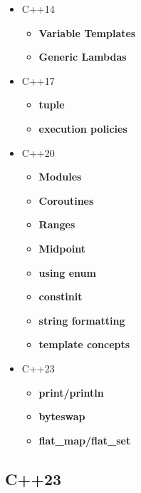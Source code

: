 \documentclass{article}
\begin{document}
\begin{itemize}
\begin{itemize}
	      \end{itemize}
	\item C++14
	      \begin{itemize}
		      \item \textbf{Variable Templates}
		      \item \textbf{Generic Lambdas}
	      \end{itemize}
	\item C++17
	      \begin{itemize}
		      \item \textbf{tuple}
		      \item \textbf{execution policies}
	      \end{itemize}
	\item C++20
	      \begin{itemize}
		      \item \textbf{Modules}
		      \item \textbf{Coroutines}
		      \item \textbf{Ranges}
		      \item \textbf{Midpoint}
		      \item \textbf{using enum}
		      \item \textbf{constinit}
		      \item \textbf{string formatting}
		      \item \textbf{template concepts}
	      \end{itemize}
	\item C++23
	      \begin{itemize}
		      \item \textbf{print/println}
		      \item \textbf{byteswap}
		      \item \textbf{flat\_map/flat\_set}
	      \end{itemize}
\end{itemize}
\subsection{C++23}
\end{document}

